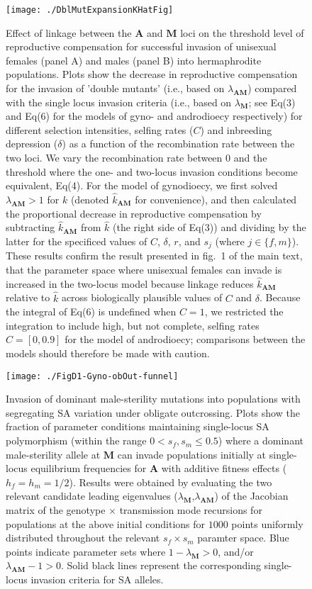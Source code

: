 \documentclass{article}
\begin{document}
\begin{figure}[htbp]
\centering
\texttt{[image: ./DblMutExpansionKHatFig]}
\caption{Effect of linkage between the $\mathbf{A}$ and $\mathbf{M}$ loci on the threshold level of reproductive compensation for successful invasion of unisexual females (panel A) and males (panel B) into hermaphrodite populations. Plots show the decrease in reproductive compensation for the invasion of 'double mutants' (i.e., based on $\lambda_{\mathbf{AM}}$) compared with the single locus invasion criteria (i.e., based on $\lambda_{\mathbf{M}}$; see Eq(3) and Eq(6) for the models of gyno- and androdioecy respectively) for different selection intensities, selfing rates ($C$) and inbreeding depression ($\delta$) as a function of the recombination rate between the two loci. We vary the recombination rate between $0$ and the threshold where the one- and two-locus invasion conditions become equivalent, Eq(4). For the model of gynodioecy, we first solved $\lambda_{\mathbf{AM}} > 1$ for $k$ (denoted $\hat{k}_{\mathbf{AM}}$ for convenience), and then calculated the proportional decrease in reproductive compensation by subtracting $\hat{k}_{\mathbf{AM}}$ from $\hat{k}$ (the right side of Eq(3)) and dividing by the latter for the specificed values of $C$, $\delta$, $r$, and $s_j$ (where $j \in \{f,m\}$). These results confirm the result presented in fig.~1 of the main text, that the parameter space where unisexual females can invade is increased in the two-locus model because linkage reduces $\hat{k}_{\mathbf{AM}}$ relative to $\hat{k}$ across biologically plausible values of $C$ and $\delta$. Because the integral of Eq(6) is undefined when $C = 1$, we restricted the integration to include high, but not complete, selfing rates $C = [0, 0.9]$ for the model of androdioecy; comparisons between the models should therefore be made with caution.}
\label{fig:dblMutKHatFig}
\end{figure}
\newpage{}


\begin{figure}[ht!]
\centering
\texttt{[image: ./FigD1-Gyno-obOut-funnel]}
\caption{Invasion of dominant male-sterility mutations into populations with segregating SA variation under obligate outcrossing. Plots show the fraction of parameter conditions maintaining single-locus SA polymorphism (within the range $0 < s_f,s_m \leq 0.5$) where a dominant male-sterility allele at $\mathbf{M}$ can invade populations initially at single-locus equilibrium frequencies for $\mathbf{A}$ with additive fitness effects ($h_f=h_m=1/2$). Results were obtained by evaluating the two relevant candidate leading eigenvalues ($\lambda_{\mathbf{M}}$,$\lambda_{\mathbf{AM}}$) of the Jacobian matrix of the genotype $\times$ transmission mode recursions for populations at the above initial conditions for $1000$ points uniformly distributed throughout the relevant $s_f \times s_m$ paramter space. Blue points indicate parameter sets where $1 - \lambda_{\mathbf{M}} > 0$, and/or $\lambda_{\mathbf{AM}} - 1 > 0$. Solid black lines represent the corresponding single-locus invasion criteria for SA alleles.}
\label{fig:GynObOutFunnel}
\end{figure}
\newpage{}
\end{document}
